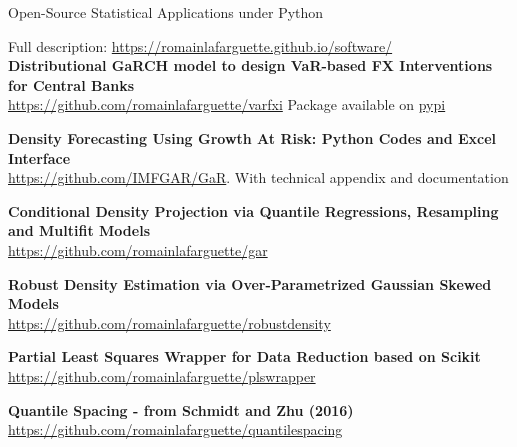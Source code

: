 \documentclass[usegeometry, 10pt, a4paper]{cv} %
\newcommand{\activite}[1]{\textbf{#1}\ }
\begin{document}
\newpage


\begin{rubriquetableau}[0.95\textwidth]{Open-Source Statistical Applications under Python}\\
  \vspace{-0.5cm}
  
Full description: \url{https://romainlafarguette.github.io/software/}\\

\small
\activite{Distributional GaRCH model to design VaR-based FX Interventions for Central Banks} \\
\hspace{0.6cm} \small{\url{https://github.com/romainlafarguette/varfxi}} Package available on \href{https://pypi.org/project/varfxi/}{pypi}
\vspace{0.4cm} 

\small
\activite{Density Forecasting Using Growth At Risk: Python Codes and Excel Interface} \\
\hspace{0.6cm} \small{\url{https://github.com/IMFGAR/GaR}. With technical
  appendix and documentation}
\vspace{0.4cm} 

\small
\activite{Conditional Density Projection via Quantile Regressions, Resampling and Multifit Models} \\
\hspace{0.6cm} \small{\url{https://github.com/romainlafarguette/gar}}
\vspace{0.4cm} 

\small
\activite{Robust Density Estimation via Over-Parametrized Gaussian Skewed Models} \\
\hspace{0.6cm} \small{\url{https://github.com/romainlafarguette/robustdensity}}
\vspace{0.4cm} 

\small
\activite{Partial Least Squares Wrapper for Data Reduction based on Scikit} \\
\hspace{0.6cm} \small{\url{https://github.com/romainlafarguette/plswrapper}}
\vspace{0.4cm} 

\small
\activite{Quantile Spacing - from Schmidt and Zhu (2016)} \\
\hspace{0.6cm} \small{\url{https://github.com/romainlafarguette/quantilespacing}}
\vspace{0.4cm} 


\end{rubriquetableau}
\end{document}
